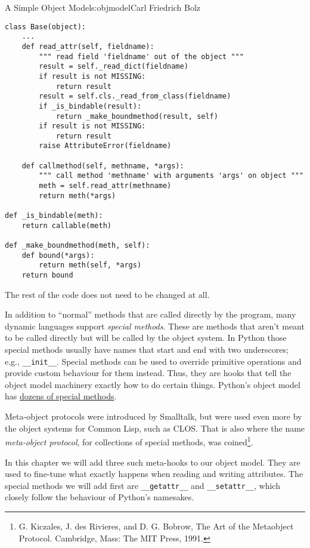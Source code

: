 \begin{aosachapter}{A Simple Object Model}{s:objmodel}{Carl Friedrich Bolz}
\begin{verbatim}
class Base(object):
    ...
    def read_attr(self, fieldname):
        """ read field 'fieldname' out of the object """
        result = self._read_dict(fieldname)
        if result is not MISSING:
            return result
        result = self.cls._read_from_class(fieldname)
        if _is_bindable(result):
            return _make_boundmethod(result, self)
        if result is not MISSING:
            return result
        raise AttributeError(fieldname)

    def callmethod(self, methname, *args):
        """ call method 'methname' with arguments 'args' on object """
        meth = self.read_attr(methname)
        return meth(*args)

def _is_bindable(meth):
    return callable(meth)

def _make_boundmethod(meth, self):
    def bound(*args):
        return meth(self, *args)
    return bound
\end{verbatim}

The rest of the code does not need to be changed at all.

\label{meta-object-protocols}

In addition to ``normal'' methods that are called directly by the
program, many dynamic languages support \emph{special methods}. These
are methods that aren't meant to be called directly but will be called
by the object system. In Python those special methods usually have names
that start and end with two underscores; e.g., \texttt{\_\_init\_\_}.
Special methods can be used to override primitive operations and provide
custom behaviour for them instead. Thus, they are hooks that tell the
object model machinery exactly how to do certain things. Python's object
model has
\href{https://docs.python.org/2/reference/datamodel.html\#special-method-names}{dozens
of special methods}.

Meta-object protocols were introduced by Smalltalk, but were used even
more by the object systems for Common Lisp, such as CLOS. That is also
where the name \emph{meta-object protocol}, for collections of special
methods, was coined\footnote{G. Kiczales, J. des Rivieres, and D. G.
  Bobrow, The Art of the Metaobject Protocol. Cambridge, Mass: The MIT
  Press, 1991.}.

In this chapter we will add three such meta-hooks to our object model.
They are used to fine-tune what exactly happens when reading and writing
attributes. The special methods we will add first are
\texttt{\_\_getattr\_\_} and \texttt{\_\_setattr\_\_}, which closely
follow the behaviour of Python's namesakes.


\end{aosachapter}
